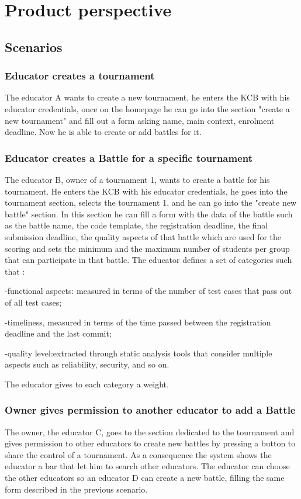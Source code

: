 \section{Product perspective}
\subsection{Scenarios}

\subsubsection{ Educator creates a tournament }
The educator A wants to create a new tournament, he enters the KCB with his educator credentials, once on the homepage he can go into the section "create a new tournament" and fill out a form asking name, main context, enrolment deadline. Now he is able to create or add battles for it.

\subsubsection{ Educator creates a Battle for a specific tournament}
The educator B, owner of a tournament 1, wants to create a battle for his tournament. He enters the KCB with his educator credentials, he goes into the tournament section, selects the tournament 1, and he can go into the "create new battle" section. In this section he can fill a form with the data of the battle such as the battle name, the code template, the registration deadline, the final submission deadline, the quality aspects of that battle which are used for the scoring and sets the minimum and the maximum number of students per group that can participate in that battle. The educator defines a set of categories such that :

    -functional aspects: measured in terms of the number of test cases that pass out of all test cases; 
    
    -timeliness, measured in terms of the time passed between the registration deadline and the last commit;
    
    -quality level:extracted through static analysis tools that consider multiple aspects such as reliability, security, and so on.

The educator gives to each category a  weight.    

\subsubsection{Owner gives permission to another educator to add a Battle}
The owner, the educator C, goes to the section dedicated to the tournament and gives permission to other educators to create new battles by pressing a button to share the control of a tournament. As a consequence the system shows the educator a bar that let him to search other educators. The educator can choose the other educators so an educator D can create a new battle, filling the same form described in the previous scenario. 

